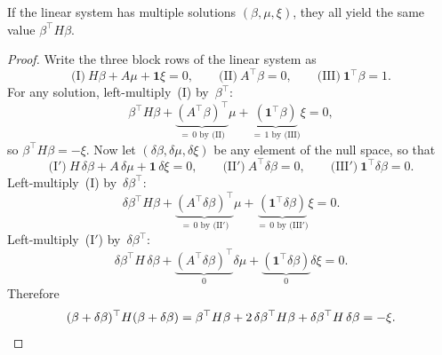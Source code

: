 \begin{notationupdated}
\begin{lemma}\label{lem:well-defined}
If the linear system has multiple solutions
$(\beta, \mu, \xi)$, they all yield the same value
$\beta^\top H \beta$.
\end{lemma}

\begin{proof}
Write the three block rows of the linear system as
\[
  \text{(I)}\ H\beta + A\mu + \mathbf{1}\xi = 0, \qquad
  \text{(II)}\ A^\top \beta = 0, \qquad
  \text{(III)}\ \mathbf{1}^\top \beta = 1.
\]
For any solution, left-multiply~(I) by~$\beta^\top$:
\[
  \beta^\top H\beta
  + \underbrace{(A^\top\beta)^\top}_{=\,0\text{ by (II)}}\mu
  + \underbrace{(\mathbf{1}^\top\beta)}_{=\,1\text{ by (III)}}\xi
  = 0,
\]
so $\beta^\top H\beta = -\xi$.
Now let $(\delta\beta, \delta\mu, \delta\xi)$ be any element
of the null space, so that
\[
  \text{(I$'$)}\ H\,\delta\beta + A\,\delta\mu + \mathbf{1}\,\delta\xi = 0, \qquad
  \text{(II$'$)}\ A^\top\delta\beta = 0, \qquad
  \text{(III$'$)}\ \mathbf{1}^\top\delta\beta = 0.
\]
Left-multiply~(I) by~$\delta\beta^\top$:
\[
  \delta\beta^\top H\beta
  + \underbrace{(A^\top\delta\beta)^\top}_{=\,0\text{ by (II$'$)}}\mu
  + \underbrace{(\mathbf{1}^\top\delta\beta)}_{=\,0\text{ by (III$'$)}}\xi
  = 0.
\]
Left-multiply~(I$'$) by~$\delta\beta^\top$:
\[
  \delta\beta^\top H\,\delta\beta
  + \underbrace{(A^\top\delta\beta)^\top}_{0}\delta\mu
  + \underbrace{(\mathbf{1}^\top\delta\beta)}_{0}\delta\xi
  = 0.
\]
Therefore
\[
  (\beta + \delta\beta)^\top H(\beta + \delta\beta)
  = \beta^\top H\beta
    + 2\,\delta\beta^\top H\beta
    + \delta\beta^\top H\,\delta\beta
  = -\xi. \qedhere
\]
\end{proof}
\end{notationupdated}


